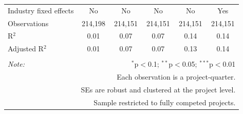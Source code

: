\documentclass[
]{article}
\begin{document}
\begin{table}[H]
\begin{tabular}{@{\extracolsep{-2pt}}lccccc}
Industry fixed effects & No & No & No & No & Yes \\ 
Observations & 214,198 & 214,151 & 214,151 & 214,151 & 214,151 \\ 
R$^{2}$ & 0.01 & 0.07 & 0.07 & 0.14 & 0.14 \\ 
Adjusted R$^{2}$ & 0.01 & 0.07 & 0.07 & 0.13 & 0.14 \\ 
\hline 
\hline \\[-1.8ex] 
\textit{Note:}  & \multicolumn{5}{r}{$^{*}$p$<$0.1; $^{**}$p$<$0.05; $^{***}$p$<$0.01} \\ 
 & \multicolumn{5}{r}{Each observation is a project-quarter.} \\ 
 & \multicolumn{5}{r}{SEs are robust and clustered at the project level.} \\ 
 & \multicolumn{5}{r}{Sample restricted to fully competed projects.} \\ 
\end{tabular} 
\end{table}
\end{document}
